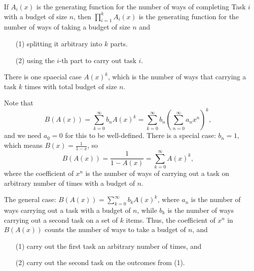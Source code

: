 \begin{prev}
    If \(A_i(x)\) is the generating function for the number of ways of completing Task \(i\) with a budget of size \(n\), then \(\prod _{i=1}^k A_i(x)\) is the generating function for the number of ways of taking a budget of size \(n\) and 
    \begin{itemize}
        \item [(1)] splitting it arbitrary into \(k\) parts. 
        \item [(2)] using the \(i\)-th part to carry out task \(i\). 
    \end{itemize}      
    There is one spaecial case \(A(x)^k\), which is the number of ways that carrying a task \(k\) times with total budget of size \(n\). 
    
    Note that 
    \[
        B(A(x)) = \sum_{k=0}^{\infty} b_n A(x)^k = \sum_{k=0}^{\infty} b_n \left( \sum_{n=0}^{\infty} a_n x^n  \right)^k,   
    \] and we need \(a_0 = 0\) for this to be well-defined. There is a special case: \(b_n = 1\), which means \(B(x) = \frac{1}{1-x}\), so 
    \[
        B(A(x)) = \frac{1}{1-A(x)} =\sum_{k=0}^{\infty} A(x)^k, 
    \] where the coefficient of \(x^n\) is the number of ways of carrying out a task on arbitrary number of times with a budget of \(n\). 
    
    The general case: \(B(A(x)) = \sum_{k=0}^{\infty} b_k A(x)^k \), where \(a_n\) is the number of ways carrying out a task with a budget of \(n\), while \(b_k\) is the number of ways carrying out a second task on a set of \(k\) items. Thus, the coefficient of \(x^n\) in \(B(A(x))\) counts the number of ways to take a budget of \(n\), and 
    \begin{itemize}
        \item [(1)] carry out the first task an arbitrary number of times, and 
        \item [(2)] carry out the second task on the outcomes from (1).
    \end{itemize}        
\end{prev}

